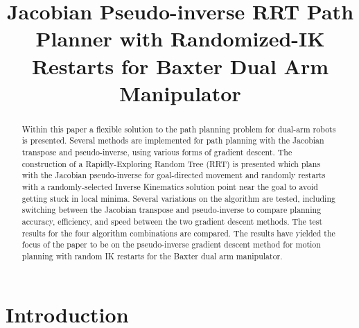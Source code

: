 \documentclass[conference]{IEEEtran} \usepackage[T1]{fontenc} \usepackage[backend=biber, style=ieee]{biblatex}
\begin{document}
\title{Jacobian Pseudo-inverse RRT Path Planner with Randomized-IK Restarts for Baxter Dual Arm Manipulator}

\author{
}

\maketitle

\begin{abstract}
Within this paper a flexible solution to the path planning problem for dual-arm robots is presented. Several methods are implemented for path planning with the 
Jacobian transpose and pseudo-inverse, using various forms of gradient descent. The construction of a Rapidly-Exploring Random Tree (RRT) is presented which plans with the Jacobian 
pseudo-inverse for goal-directed movement and randomly restarts with a randomly-selected Inverse Kinematics solution point near the goal to avoid getting stuck 
in local minima. Several variations on the algorithm are tested, including switching between the Jacobian transpose and pseudo-inverse to compare planning 
accuracy, efficiency, and speed between the two gradient descent methods. The test results for the four algorithm combinations are compared. The results have 
yielded the focus of the paper to be on the pseudo-inverse gradient descent method for motion planning with random IK restarts for the Baxter dual arm 
manipulator.
\end{abstract}

\section{Introduction} \label{Introduction}
\end{document}

